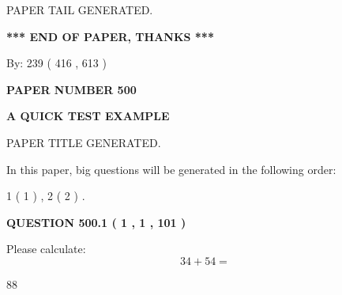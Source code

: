 \documentclass[12pt]{article}
\begin{document}
\vspace{2.0in} PAPER TAIL GENERATED.
   
   
   
   
\vspace{1.0in} 
{\textbf{\large{ *** END OF PAPER, THANKS *** }}} 
   
   
\hspace{1.0in} By: 
 239 ( 416 ,  613 )
   
   
   
   
\newpage 
\setcounter{page}{ 
   500001 } 
   
   
   
   
 {\textbf{ \Large{ PAPER NUMBER  500  }}}
   
   
\vspace{0.2in}
   
   
   
   
   
   
   
   
 \vspace{0.2in}
{\LARGE {\textbf{ A QUICK TEST EXAMPLE}}}
   
   
 PAPER TITLE GENERATED.
   
   
   
\vspace{0.2in}
   
In this paper, big questions will be generated in the following order: 
   
   
   1 ( 1 )
 ,
   2 ( 2 )
 .
  
\vspace{0.2in}
  
{\textbf{\Large{QUESTION
500.1 
 ( 1 , 1 , 101 )
}}}
  
  
 
Please calculate:
\begin{equation}
34 +  %
54 = \nonumber
\end{equation}
 
 
 
\noindent{}
 
 

88
 
 
\noindent{}
 
 

 
 
\end{document}
